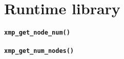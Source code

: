 
\chapter{Runtime library}

\subsubsection{{\tt xmp\_get\_node\_num()}}

\subsubsection{{\tt xmp\_get\_num\_nodes()}}

